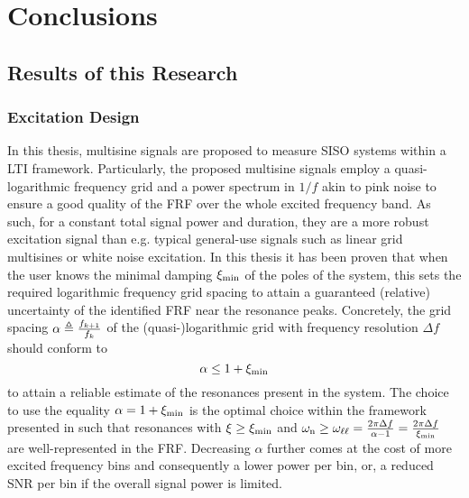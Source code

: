 \chapter{Conclusions}

\section{Results of this Research}

  \subsection{Excitation Design}
  In this thesis, multisine signals are proposed to measure \gls{SISO} systems within a \gls{LTI} framework.
  Particularly, the proposed multisine signals employ a quasi-logarithmic frequency grid and a power spectrum in $1/f$ akin to pink noise to ensure a good quality of the \gls{FRF} over the whole excited frequency band.
  As such, for a constant total signal power and duration, they are a more robust excitation signal than e.g. typical general-use signals such as linear grid multisines or white noise excitation.
  In this thesis it has been proven that when the user knows the minimal damping $\damping[\min]$ of the poles of the system, this sets the required logarithmic frequency grid spacing to attain a guaranteed (relative) uncertainty of the identified \gls{FRF} near the resonance peaks.
  Concretely, the grid spacing $\alpha \isdef \frac{f_{k+1}}{f_k}$ of the (quasi-)logarithmic grid with frequency resolution $\Delta f$ should conform to
  \begin{equation}
    \alpha \leq 1 + \damping[\min]
  \end{equation}
  to attain a reliable estimate of the resonances present in the system.
  The choice to use the equality $\alpha = 1+ \damping[\min]$ is the optimal choice within the framework presented in  such that resonances with $\damping \geq \damping[\min]$ and $\wn \geq \omegaLinLog = \frac{2 \pi \Delta f}{\alpha-1} = \frac{2 \pi \Delta f}{\damping[\min]}$ are well-represented in the \gls{FRF}.
  Decreasing $ \alpha$ further comes at the cost of more excited frequency bins and consequently a lower power per bin, or, a reduced \gls{SNR} per bin if the overall signal power is limited.

